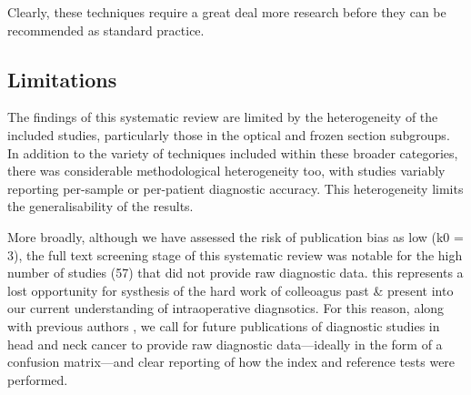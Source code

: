 Clearly, these techniques require a great deal more research before they can be recommended as standard practice.

\subsection{Limitations}

The findings of this systematic review are limited by the heterogeneity of the included studies, particularly those in the optical and frozen section subgroups.
In addition to the variety of techniques included within these broader categories, there was considerable methodological heterogeneity too, with studies variably reporting per-sample or per-patient diagnostic accuracy.
This heterogeneity limits the generalisability of the results.

More broadly, although we have assessed the risk of publication bias as low (k0 = 3), the full text screening stage of this systematic review was notable for the high number of studies (57) that did not provide raw diagnostic data.
this represents a lost opportunity for systhesis of the hard work of colleoagus past \& present into our current understanding of intraoperative diagnsotics.
For this reason, along with previous authors \cite{stjohnDiagnosticAccuracyIntraoperative2017, irwigGuidelinesMetaanalysesEvaluating1994}, we call for future publications of diagnostic studies in head and neck cancer to provide raw diagnostic data---ideally in the form of a confusion matrix---and clear reporting of how the index and reference tests were performed.
